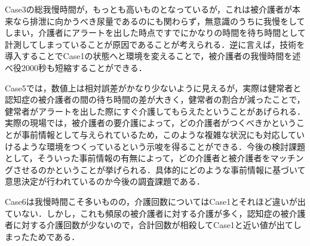 Case3の総我慢時間が，もっとも高いものとなっているが，これは被介護者が本来なら排泄に向かうべき尿量であるのにも関わらず，無意識のうちに我慢をしてしまい，介護者にアラートを出した時点ですでにかなりの時間を待ち時間として計測してしまっていることが原因であることが考えられる．逆に言えば，技術を導入することでCase1の状態へと環境を変えることで，被介護者の我慢時間を述べ役2000秒も短縮することができる．

Case5では，数値上は相対誤差がかなり少ないように見えるが，実際は健常者と認知症の被介護者の間の待ち時間の差が大きく，健常者の割合が減ったことで，健常者がアラートを出した際にすぐ介護してもらえたということがあげられる．実際の現場では，被介護者の要介護によって，どの介護者がつくべきかということが事前情報として与えられているため，このような複雑な状況にも対応していけるような環境をつくっているという示唆を得ることができる．今後の検討課題として，そういった事前情報の有無によって，どの介護者と被介護者をマッチングさせるのかということが挙げられる．具体的にどのような事前情報に基づいて意思決定が行われているのか今後の調査課題である．

Case6は我慢時間こそ多いものの，介護回数についてはCase1とそれほど違いが出ていない．しかし，これも頻尿の被介護者に対する介護が多く，認知症の被介護者に対する介護回数が少ないので，合計回数が相殺してCase1と近い値が出てしまったためである．
